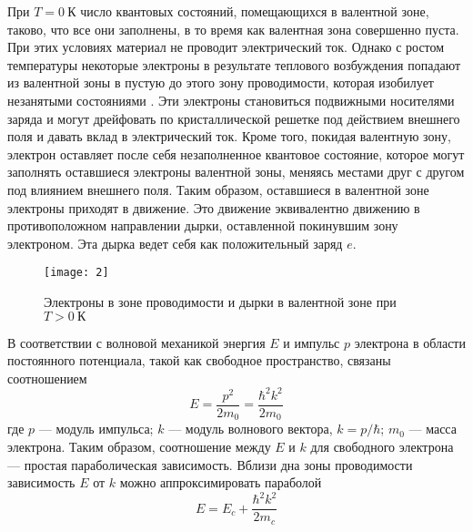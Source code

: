 \documentclass[a4paper, 12pt]{article}
\begin{document}
При $T=0\: К$ число квантовых состояний, помещающихся в валентной зоне,
таково, что все они заполнены, в то время как валентная зона
совершенно пуста. При этих условиях материал не проводит электрический
ток. Однако с ростом температуры некоторые электроны в
результате теплового возбуждения попадают из валентной зоны в пустую
до этого зону проводимости, которая изобилует незанятыми состояниями
. Эти электроны становиться подвижными носителями заряда и
могут дрейфовать по кристаллической решетке под действием внешнего
поля и давать вклад в электрический ток. Кроме того, покидая валентную
зону, электрон оставляет после себя незаполненное квантовое состояние,
которое могут заполнять оставшиеся электроны валентной зоны, меняясь
местами друг с другом под влиянием внешнего поля. Таким образом,
оставшиеся в валентной зоне электроны приходят в движение. Это
движение эквивалентно движению в противоположном направлении дырки,
оставленной покинувшим зону электроном. Эта дырка ведет себя как
положительный заряд $e$.

\begin{figure}[H]
    \texttt{[image: 2]} 
    \caption{Электроны в зоне проводимости и дырки в валентной зоне
    при $T>0\: К$}
    \label{fig:2}
\end{figure}

В соответствии с волновой механикой энергия $E$ и импульс $p$
электрона в области постоянного потенциала, такой как свободное
пространство, связаны соотношением 
\begin{equation}
    E = \dfrac{p^2}{2m_{0}}=\dfrac{\hbar^2 k^2}{2m_{0}}
    \label{eq:1}
\end{equation}
где $p$ --- модуль импульса; $k$ --- модуль волнового вектора,
$k=p/\hbar$; $m_{0}$ --- масса электрона. Таким образом, соотношение
между $E$ и $k$ для свободного электрона --- простая параболическая
зависимость. Вблизи дна зоны проводимости зависимость $E$ от $k$ можно
аппроксимировать параболой 
\begin{equation}
    E = E_{c}+ \frac{\hbar^2 k^2}{2m_{c}}
    \label{eq:2}
\end{equation}
\end{document}
